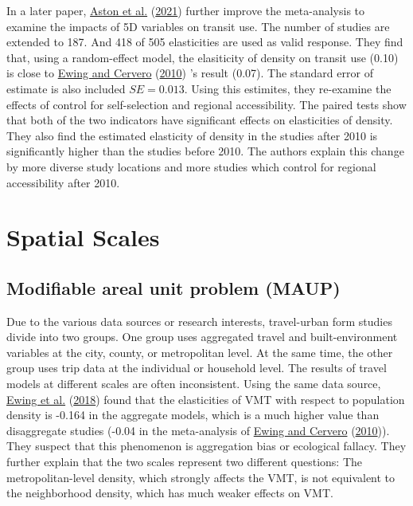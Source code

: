 \documentclass[
  11pt,
  openany]{memoir}
\begin{document}
In a later paper, \protect\hyperlink{ref-astonExploringBuiltEnvironment2021}{Aston et al.} (\protect\hyperlink{ref-astonExploringBuiltEnvironment2021}{2021}) further improve the meta-analysis to examine the impacts of 5D variables on transit use. The number of studies are extended to 187. And 418 of 505 elasticities are used as valid response. They find that, using a random-effect model, the elasiticity of density on transit use (0.10) is close to \protect\hyperlink{ref-ewingTravelBuiltEnvironment2010}{Ewing and Cervero} (\protect\hyperlink{ref-ewingTravelBuiltEnvironment2010}{2010}) 's result (0.07). The standard error of estimate is also included \(SE=0.013\). Using this estimites, they re-examine the effects of control for self-selection and regional accessibility. The paired tests show that both of the two indicators have significant effects on elasticities of density. They also find the estimated elasticity of density in the studies after 2010 is significantly higher than the studies before 2010. The authors explain this change by more diverse study locations and more studies which control for regional accessibility after 2010.

\hypertarget{scale}{%
\section{Spatial Scales}\label{scale}}

\hypertarget{modifiable-areal-unit-problem-maup}{%
\subsection{Modifiable areal unit problem (MAUP)}\label{modifiable-areal-unit-problem-maup}}

Due to the various data sources or research interests, travel-urban form studies divide into two groups. One group uses aggregated travel and built-environment variables at the city, county, or metropolitan level. At the same time, the other group uses trip data at the individual or household level.
The results of travel models at different scales are often inconsistent. Using the same data source, \protect\hyperlink{ref-ewingTestingNewmanKenworthy2018}{Ewing et al.} (\protect\hyperlink{ref-ewingTestingNewmanKenworthy2018}{2018}) found that the elasticities of VMT with respect to population density is -0.164 in the aggregate models, which is a much higher value than disaggregate studies (-0.04 in the meta-analysis of \protect\hyperlink{ref-ewingTravelBuiltEnvironment2010}{Ewing and Cervero} (\protect\hyperlink{ref-ewingTravelBuiltEnvironment2010}{2010})). They suspect that this phenomenon is aggregation bias or ecological fallacy. They further explain that the two scales represent two different questions: The metropolitan-level density, which strongly affects the VMT, is not equivalent to the neighborhood density, which has much weaker effects on VMT.
\end{document}
